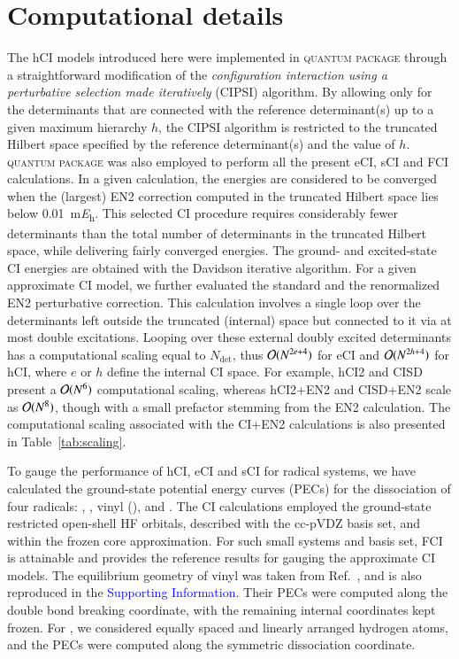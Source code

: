 \documentclass[aip,jcp,reprint,noshowkeys,superscriptaddress]{revtex4-1}
\newcommand{\SupInf}{\textcolor{blue}{Supporting Information}}
\newcommand{\QP}{\textsc{quantum package}}
\newcommand{\Ndet}{N_\text{det}}
\begin{document}
\section{Computational details}
\label{sec:compdet}

The hCI models introduced here were implemented in {\QP} \cite{Garniron_2019} through a straightforward modification of the
\textit{configuration interaction using a perturbative selection made iteratively} (CIPSI) algorithm. \cite{Huron_1973,Giner_2013,Giner_2015,Garniron_2018}
By allowing only for the determinants that are connected with the reference determinant(s) up to a given maximum hierarchy $h$,
the CIPSI algorithm is restricted to the truncated Hilbert space specified by the reference determinant(s) and the value of $h$.
{\QP} \cite{Garniron_2019} was also employed to perform all the present eCI, sCI and FCI calculations.
In a given calculation, the energies are considered to be converged when the (largest) EN2 correction computed in the truncated Hilbert space
lies below \SI{0.01}{\milli\hartree}. \cite{Garniron_2018}
This selected CI procedure requires considerably fewer determinants than the total number of determinants in the truncated Hilbert space,
while delivering fairly converged energies.
The ground- and excited-state CI energies are obtained with the Davidson iterative algorithm. \cite{Davidson_1975}
For a given approximate CI model, we further evaluated the standard and the renormalized EN2 perturbative correction. \cite{Garniron_2019}
This calculation involves a single loop over the determinants left outside the truncated (internal) space but connected to it via at most double excitations.
Looping over these external doubly excited determinants has a computational scaling equal to $\Ndet$,
thus $\order*{N^{2e+4}}$ for eCI and $\order*{N^{2h+4}}$ for hCI, where $e$ or $h$ define the internal CI space.
For example, hCI2 and CISD present a $\order*{N^6}$ computational scaling, whereas hCI2+EN2 and CISD+EN2 scale as $\order*{N^8}$,
though with a small prefactor stemming from the EN2 calculation.
The computational scaling associated with the CI+EN2 calculations is also presented in Table~\ref{tab:scaling}.

To gauge the performance of hCI, eCI and sCI for radical systems,
we have calculated the ground-state potential energy curves (PECs) for the dissociation of four radicals:
, , vinyl (), and .
The CI calculations employed the ground-state restricted open-shell HF orbitals, described with the cc-pVDZ basis set, and within the frozen core approximation.
For such small systems and basis set, FCI is attainable and provides the reference results for gauging the approximate CI models.
The equilibrium geometry of vinyl was taken from Ref.~, and is also reproduced in the {\SupInf}.
Their PECs were computed along the  double bond breaking coordinate, with the remaining internal coordinates kept frozen.
For , we considered equally spaced and linearly arranged hydrogen atoms, and the PECs were computed along the symmetric dissociation coordinate.
\end{document}
